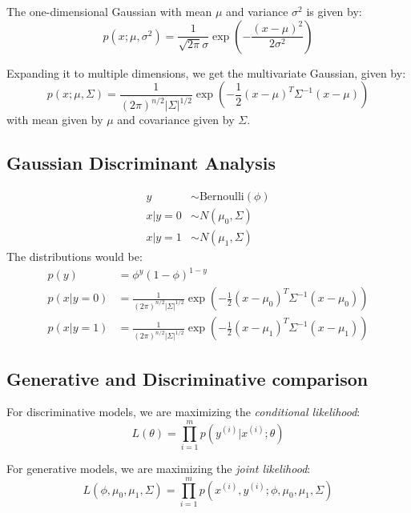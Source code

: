 \documentclass[letterpaper,10pt]{article}
\begin{document}
The one-dimensional Gaussian with mean $\mu$ and variance $\sigma^2$ is given by:
\begin{equation}
p(x; \mu, \sigma^2) = \frac{1}{\sqrt{2\pi} \sigma} \exp \left( - \frac{(x-\mu)^2}{2\sigma^2} \right)
\end{equation}

Expanding it to multiple dimensions, we get the multivariate Gaussian, given by:
\begin{equation}
p(x; \mu, \Sigma) = \frac{1}{(2\pi)^{n/2} |\Sigma|^{1/2}} \exp \left( -\frac{1}{2} (x-\mu)^T \Sigma^{-1} (x-\mu) \right)
\end{equation}
with mean given by $\mu$ and covariance given by $\Sigma$.


\subsection{Gaussian Discriminant Analysis}


\begin{align}
y &\sim \text{Bernoulli} (\phi) \\
x|y=0 &\sim N(\mu_0, \Sigma) \\
x|y=1 &\sim N(\mu_1, \Sigma)
\end{align}
The distributions would be:
\begin{align}
p(y) &= \phi^y (1-\phi)^{1-y} \\
p(x|y=0) &= \frac{1}{(2\pi)^{n/2} | \Sigma | ^{1/2}}\exp \left( - \frac{1}{2} (x-\mu_0)^T \Sigma^{-1} (x-\mu_0) \right) \\
p(x|y=1) &= \frac{1}{(2\pi)^{n/2} | \Sigma | ^{1/2}}\exp \left( - \frac{1}{2} (x-\mu_1)^T \Sigma^{-1} (x-\mu_1) \right)
\end{align}


\subsection{Generative and Discriminative comparison}

For discriminative models, we are maximizing the \textit{conditional likelihood}:
\begin{equation}
L(\theta) = \prod_{i=1}^m p(y^{(i)} | x^{(i)}; \theta)
\end{equation}




For generative models, we are maximizing the \textit{joint likelihood}:
\begin{equation}
L(\phi, \mu_0, \mu_1, \Sigma) = \prod_{i=1}^m p(x^{(i)}, y^{(i)} ; \phi, \mu_0, \mu_1, \Sigma)
\end{equation}
\end{document}
